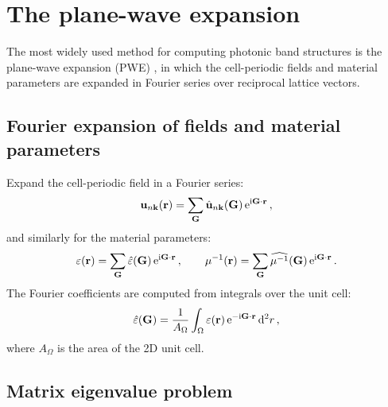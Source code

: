 \section{The plane-wave expansion}
\label{sec:ch4-pwe}

The most widely used method for computing photonic band structures is
the plane-wave expansion (PWE) \cite{ozawa2018topological,haldane2008possible,initio2026pdf}, in which the cell-periodic fields and
material parameters are expanded in Fourier series over reciprocal
lattice vectors.

\subsection{Fourier expansion of fields and material parameters}
\label{sec:ch4-fourier}

Expand the cell-periodic field in a Fourier series:
\begin{equation}\label{eq:ch4-fourier-field}
  \mathbf{u}_{n\mathbf{k}}(\mathbf{r})
  = \sum_{\mathbf{G}} \hat{\mathbf{u}}_{n\mathbf{k}}(\mathbf{G})\,
    \mathrm{e}^{\mathrm{i}\mathbf{G}\cdot\mathbf{r}}\,,
\end{equation}
and similarly for the material parameters:
\begin{equation}\label{eq:ch4-fourier-eps}
  \varepsilon(\mathbf{r}) = \sum_{\mathbf{G}} \hat{\varepsilon}(\mathbf{G})\,
    \mathrm{e}^{\mathrm{i}\mathbf{G}\cdot\mathbf{r}}\,,
  \qquad
  \mu^{-1}(\mathbf{r}) = \sum_{\mathbf{G}} \widehat{\mu^{-1}}(\mathbf{G})\,
    \mathrm{e}^{\mathrm{i}\mathbf{G}\cdot\mathbf{r}}\,.
\end{equation}
The Fourier coefficients are computed from integrals over the unit cell:
\begin{equation}\label{eq:ch4-fourier-coeff}
  \hat{\varepsilon}(\mathbf{G})
  = \frac{1}{A_\Omega}\int_\Omega
    \varepsilon(\mathbf{r})\,\mathrm{e}^{-\mathrm{i}\mathbf{G}\cdot\mathbf{r}}\,\mathrm{d}^2 r\,,
\end{equation}
where $A_\Omega$ is the area of the 2D unit cell.

\subsection{Matrix eigenvalue problem}
\label{sec:ch4-matrix-evp}

